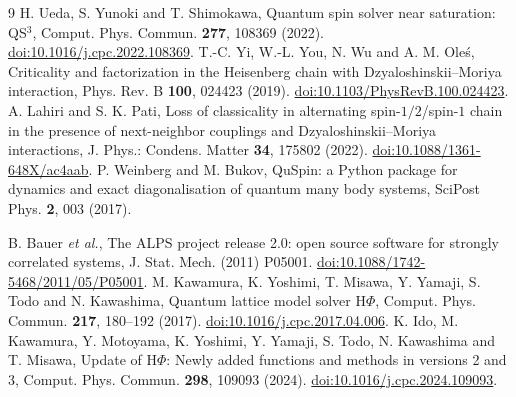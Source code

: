 \documentclass[preprint,12pt,nopreprintline]{elsarticle}
\begin{document}
\begin{thebibliography}{9}
H. Ueda, S. Yunoki and T. Shimokawa,
Quantum spin solver near saturation: QS$^3$,
Comput. Phys. Commun. \textbf{277}, 108369 (2022).
\href{https://doi.org/10.1016/j.cpc.2022.108369}{doi:10.1016/j.cpc.2022.108369}.
T.-C. Yi, W.-L. You, N. Wu and A. M. Ole\'s,
Criticality and factorization in the Heisenberg chain with
Dzyaloshinskii--Moriya interaction,
Phys. Rev. B \textbf{100}, 024423 (2019).
\href{https://doi.org/10.1103/PhysRevB.100.024423}{doi:10.1103/PhysRevB.100.024423}.
A. Lahiri and S. K. Pati,
Loss of classicality in alternating spin-$1/2$/spin-$1$ chain
in the presence of next-neighbor couplings and
Dzyaloshinskii--Moriya interactions,
J. Phys.: Condens. Matter \textbf{34}, 175802 (2022).
\href{https://doi.org/10.1088/1361-648X/ac4aab}{doi:10.1088/1361-648X/ac4aab}.
P. Weinberg and M. Bukov,
QuSpin: a Python package for dynamics and exact diagonalisation of quantum many body systems,
SciPost Phys. \textbf{2}, 003 (2017).

B. Bauer \emph{et al.},
The ALPS project release 2.0: open source software for
strongly correlated systems,
J. Stat. Mech. (2011) P05001.
\href{https://doi.org/10.1088/1742-5468/2011/05/P05001}
{doi:10.1088/1742-5468/2011/05/P05001}.
M. Kawamura, K. Yoshimi, T. Misawa, Y. Yamaji,
S. Todo and N. Kawashima,
Quantum lattice model solver H$\Phi$,
Comput. Phys. Commun. \textbf{217}, 180--192 (2017).
\href{https://doi.org/10.1016/j.cpc.2017.04.006}
{doi:10.1016/j.cpc.2017.04.006}.
K. Ido, M. Kawamura, Y. Motoyama, K. Yoshimi,
Y. Yamaji, S. Todo, N. Kawashima and T. Misawa,
Update of H$\Phi$: Newly added functions and methods
in versions 2 and 3,
Comput. Phys. Commun. \textbf{298}, 109093 (2024).
\href{https://doi.org/10.1016/j.cpc.2024.109093}
{doi:10.1016/j.cpc.2024.109093}.
\end{thebibliography}
\end{document}
